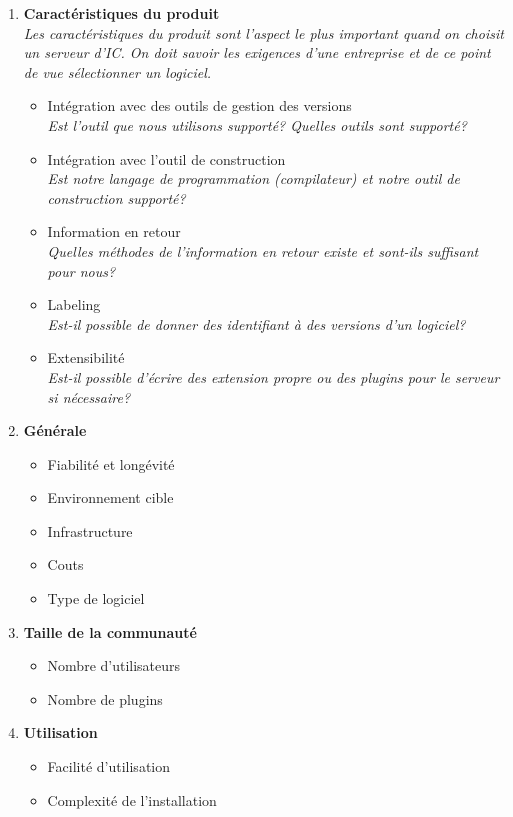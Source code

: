\begin{enumerate}
\item \textbf{Caractéristiques du produit} \\
\textit{Les caractéristiques du produit sont l'aspect le plus important quand on choisit un serveur d'IC. On doit savoir les exigences d'une entreprise et de ce point de vue sélectionner un logiciel.}
	\begin{itemize}
		\item Intégration avec des outils de gestion des versions \\
		\textit{Est l'outil que nous utilisons supporté? Quelles outils sont supporté?}
		\item Intégration avec l'outil de construction \\
		\textit{Est notre langage de programmation (compilateur) et notre outil de construction supporté?}
		\item Information en retour \\
		\textit{Quelles méthodes de l'information en retour existe et sont-ils suffisant pour nous?}
		\item Labeling \\
		\textit{Est-il possible de donner des identifiant à des versions d'un logiciel?}
		\item Extensibilité \\
		\textit{Est-il possible d'écrire des extension propre ou des plugins pour le serveur si nécessaire?}
	\end{itemize}
\item \textbf{Générale}
	\begin{itemize}
		\item Fiabilité et longévité
		\item Environnement cible
		\item Infrastructure
		\item Couts
		\item Type de logiciel
	\end{itemize}
\item \textbf{Taille de la communauté}
	\begin{itemize}
		\item Nombre d'utilisateurs
		\item Nombre de plugins
	\end{itemize}
\item \textbf{Utilisation}
	\begin{itemize}
		\item Facilité d'utilisation
		\item Complexité de l'installation
	\end{itemize}
\end{enumerate}
